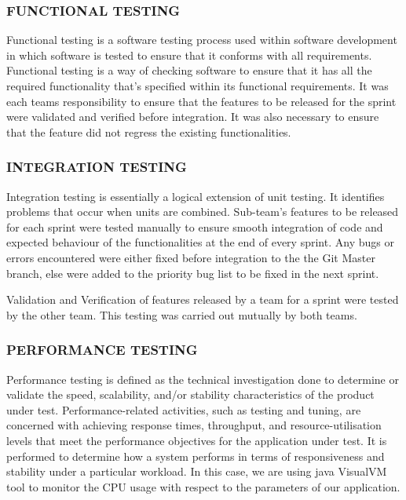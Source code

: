\documentclass[11pt,a4paper]{article}
\begin{document}
	\subsubsection{FUNCTIONAL TESTING}
	
	Functional testing is a software testing process used within software development in which software is tested to ensure that it conforms with all requirements. Functional testing is a way of checking software to ensure that it has all the required functionality that's specified within its functional requirements. \cite{func} It was each team\textquotesingle s responsibility to ensure that the features to be released for the sprint were validated and verified before integration. It was also necessary to ensure that the feature did not regress the existing functionalities.
	
	\subsubsection{INTEGRATION TESTING}
	Integration testing is essentially a logical extension of unit
	testing. It identifies problems that occur when units are combined.\cite{int03} Sub-team’s features to be released for each sprint were tested manually to ensure smooth integration of code and expected behaviour of the functionalities at the end of every sprint.
	Any bugs or errors encountered were either fixed before integration to the the Git Master branch, else were added to the priority bug list to be fixed in the next sprint.

	Validation and Verification of features released by a team for a sprint were tested by the other team. This testing was carried out mutually by both teams.
	
	\subsubsection{PERFORMANCE TESTING}
	Performance testing is defined as the technical investigation done to determine or validate the speed, scalability, and/or stability characteristics of the product under test. Performance-related activities, such as testing and tuning, are concerned with achieving response times, throughput, and resource-utilisation levels that meet the performance objectives for the application under test. It is performed to determine how a system performs in terms of responsiveness and stability under a particular workload. In this case, we are using java VisualVM tool to monitor the CPU usage with respect to the parameters of our application.
		
\end{document}
